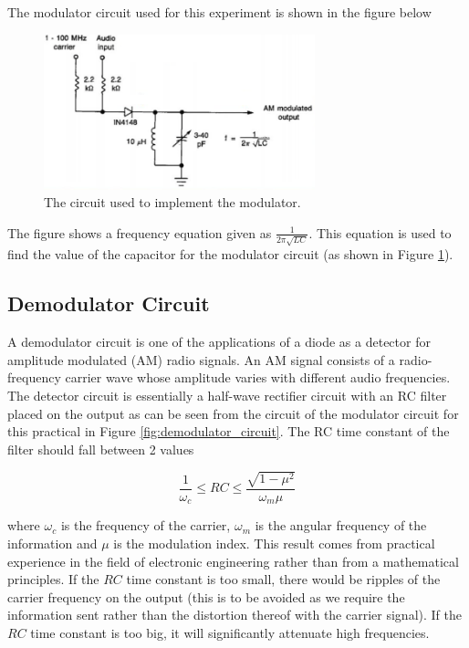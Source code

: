\documentclass[12pt, a4paper]{article}
\begin{document}
		The modulator circuit used for this experiment is shown in the figure below

		\begin{figure}[H]
			\centering
			\includegraphics[width=0.7\textwidth]{images/modulator_circuit.png}
			\caption{The circuit used to implement the modulator.}
			\label{fig:modulator_circuit}
		\end{figure}

		The figure shows a frequency equation given as $\frac{1}{2\pi\sqrt{LC}}$. This equation is used to find the value of the capacitor for the modulator circuit (as shown in Figure \ref{fig:modulator_circuit}).
	\subsection{Demodulator Circuit}

		A demodulator circuit is one of the applications of a diode as a detector for amplitude modulated (AM) radio signals. An AM signal consists of a radio-frequency carrier wave whose amplitude varies with different audio frequencies. The detector circuit is essentially a half-wave rectifier circuit with an RC filter placed on the output as can be seen from the circuit of the modulator circuit for this practical in Figure \ref{fig:demodulator_circuit}. The RC time constant of the filter should fall between 2 values

		\begin{equation}
			\label{eqn:time_const_demodulator_circuit}
			\frac{1}{\omega_c} \le RC \le \frac{\sqrt{1-\mu^2}}{\omega_m\mu}
		\end{equation}

		where $\omega_c$ is the frequency of the carrier, $\omega_m$ is the angular frequency of the information and $\mu$ is the modulation index. This result comes from practical experience in the field of electronic engineering rather than from a mathematical principles. If the $RC$ time constant is too small, there would be ripples of the carrier frequency on the output (this is to be avoided as we require the information sent rather than the distortion thereof with the carrier signal). If the $RC$ time constant is too big, it will significantly attenuate high frequencies.
\end{document}
